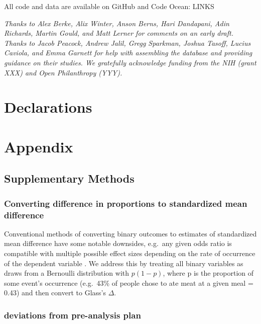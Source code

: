 \documentclass[sn-nature,pdflatex]{sn-jnl}
\begin{document}
\backmatter


All code and data are available on GitHub and Code Ocean: LINKS


\emph{Thanks to Alex Berke, Alix Winter, Anson Berns, Hari Dandapani,
Adin Richards, Martin Gould, and Matt Lerner for comments on an early
draft. Thanks to Jacob Peacock, Andrew Jalil, Gregg Sparkman, Joshua
Tasoff, Lucius Caviola, and Emma Garnett for help with assembling the
database and providing guidance on their studies. We gratefully
acknowledge funding from the NIH (grant XXX) and Open Philanthropy
(YYY).}

\section*{Declarations}\label{declarations}

\newpage

\section{Appendix}\label{appendix}

\subsection{Supplementary Methods}\label{supplementary-methods}

\subsubsection{Converting difference in proportions to standardized mean
difference}\label{converting-difference-in-proportions-to-standardized-mean-difference}

Conventional methods of converting binary outcomes to estimates of
standardized mean difference have some notable downsides, e.g.~any given
odds ratio is compatible with multiple possible effect sizes depending
on the rate of occurrence of the dependent variable \citep{gomila2021}.
We address this by treating all binary variables as draws from a
Bernoulli distribution with \(p(1 - p)\), where p is the proportion of
some event's occurrence (e.g.~43\% of people chose to ate meat at a
given meal = 0.43) and then convert to Glass's \(\Delta\).

\subsubsection{deviations from pre-analysis
plan}\label{deviations-from-pre-analysis-plan}
\end{document}
